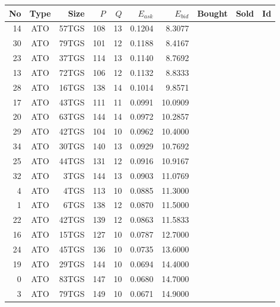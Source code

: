 \begin{tabular}{|r|c|r|r|r|r|r|p{2cm}|p{2cm}|r|}
\hline

No & Type & Size & $P$ & $Q$ & $E_{ask}$ & $E_{bid}$ & Bought & Sold & Id \\
\hline
14 & ATO & 57TGS & 108 & 13 & 0.1204 & 8.3077 &    &    &    \\
\hline
30 & ATO & 79TGS & 101 & 12 & 0.1188 & 8.4167 &    &    &    \\
\hline
23 & ATO & 37TGS & 114 & 13 & 0.1140 & 8.7692 &    &    &    \\
\hline
13 & ATO & 72TGS & 106 & 12 & 0.1132 & 8.8333 &    &    &    \\
\hline
28 & ATO & 16TGS & 138 & 14 & 0.1014 & 9.8571 &    &    &    \\
\hline
17 & ATO & 43TGS & 111 & 11 & 0.0991 & 10.0909 &    &    &    \\
\hline
20 & ATO & 63TGS & 144 & 14 & 0.0972 & 10.2857 &    &    &    \\
\hline
29 & ATO & 42TGS & 104 & 10 & 0.0962 & 10.4000 &    &    &    \\
\hline
34 & ATO & 30TGS & 140 & 13 & 0.0929 & 10.7692 &    &    &    \\
\hline
25 & ATO & 44TGS & 131 & 12 & 0.0916 & 10.9167 &    &    &    \\
\hline
32 & ATO & 3TGS & 144 & 13 & 0.0903 & 11.0769 &    &    &    \\
\hline
4 & ATO & 4TGS & 113 & 10 & 0.0885 & 11.3000 &    &    &    \\
\hline
1 & ATO & 6TGS & 138 & 12 & 0.0870 & 11.5000 &    &    &    \\
\hline
22 & ATO & 42TGS & 139 & 12 & 0.0863 & 11.5833 &    &    &    \\
\hline
16 & ATO & 15TGS & 127 & 10 & 0.0787 & 12.7000 &    &    &    \\
\hline
24 & ATO & 45TGS & 136 & 10 & 0.0735 & 13.6000 &    &    &    \\
\hline
19 & ATO & 29TGS & 144 & 10 & 0.0694 & 14.4000 &    &    &    \\
\hline
0 & ATO & 83TGS & 147 & 10 & 0.0680 & 14.7000 &    &    &    \\
\hline
3 & ATO & 79TGS & 149 & 10 & 0.0671 & 14.9000 &    &    &    \\
\hline
\end{tabular}
